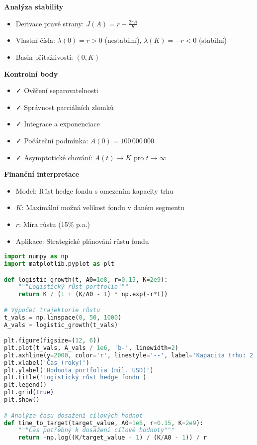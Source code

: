 \begin{example}
\noindent\textbf{Analýza stability}
\begin{itemize}
\item Derivace pravé strany: $J(A) = r - \frac{2rA}{K}$
\item Vlastní čísla: $\lambda(0) = r > 0$ (nestabilní), $\lambda(K) = -r < 0$ (stabilní)
\item Basin přitažlivosti: $(0, K)$
\end{itemize}

\noindent\textbf{Kontrolní body}
\begin{itemize}
\item ✓ Ověření separovatelnosti
\item ✓ Správnost parciálních zlomků
\item ✓ Integrace a exponenciace
\item ✓ Počáteční podmínka: $A(0) = 100\,000\,000$
\item ✓ Asymptotické chování: $A(t) \to K$ pro $t \to \infty$
\end{itemize}

\noindent\textbf{Finanční interpretace}
\begin{itemize}
\item Model: Růst hedge fondu s omezením kapacity trhu
\item $K$: Maximální možná velikost fondu v daném segmentu
\item $r$: Míra růstu (15\% p.a.)
\item Aplikace: Strategické plánování růstu fondu
\end{itemize}

\begin{lstlisting}[language=Python, caption={Implementace logistického růstu v Pythonu}, label={lst:logistic-growth}]
import numpy as np
import matplotlib.pyplot as plt

def logistic_growth(t, A0=1e8, r=0.15, K=2e9):
    """Logistický růst portfolia"""
    return K / (1 + (K/A0 - 1) * np.exp(-r*t))

# Výpočet trajektorie růstu
t_vals = np.linspace(0, 50, 1000)
A_vals = logistic_growth(t_vals)

plt.figure(figsize=(12, 6))
plt.plot(t_vals, A_vals / 1e6, 'b-', linewidth=2)
plt.axhline(y=2000, color='r', linestyle='--', label='Kapacita trhu: 2 mld USD')
plt.xlabel('Čas (roky)')
plt.ylabel('Hodnota portfolia (mil. USD)')
plt.title('Logistický růst hedge fondu')
plt.legend()
plt.grid(True)
plt.show()

# Analýza času dosažení cílových hodnot
def time_to_target(target_value, A0=1e8, r=0.15, K=2e9):
    """Čas potřebný k dosažení cílové hodnoty"""
    return -np.log((K/target_value - 1) / (K/A0 - 1)) / r


\end{lstlisting}
\end{example}

